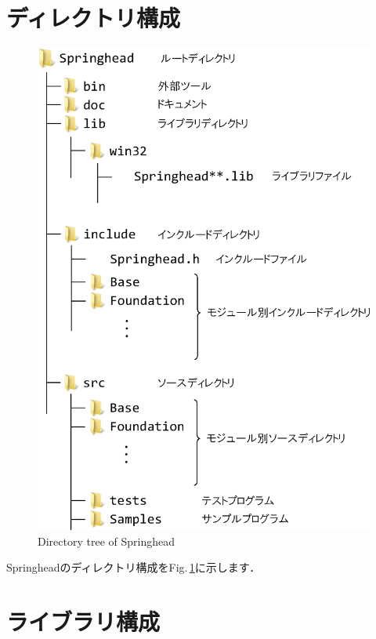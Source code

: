 \section{ディレクトリ構成}

\begin{figure}[t]
\begin{center}
\includegraphics[width=.6\hsize]{fig/filetree.eps}
\end{center}
\caption{Directory tree of Springhead}
\label{fig_filetree}
\end{figure}

Springheadのディレクトリ構成をFig.\,\ref{fig_filetree}に示します．

\section{ライブラリ構成}

